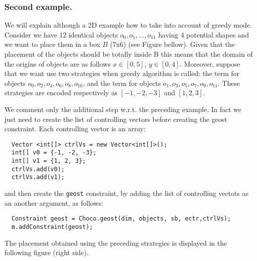\subsubsection{Second example.}\label{geostdescription:secondexample}\hypertarget{geostdescription:secondexample}{}
We will explain although a 2D example how to take into account of greedy mode. Consider we have 12 identical objects $o_0,o_1,\ldots,o_{11}$ having 4 potential shapes and we want to place them in a box $B$ (7x6) (see Figure bellow). Given that the placement of the objects should be totally inside B this means that the domain of the origins of objects are as follows $x\in [0,5]$, $y\in [0,4]$. Moreover, suppose that we want use two strategies when greedy algorithm is called: the term  for objects $o_0, o_2, o_4, o_6, o_8, o_{10}$, and the term  for objects $o_1, o_3, o_5, o_7, o_9, o_{11}$. These strategies are encoded respectively as $[-1,-2,-3]$ and $[1, 2, 3]$.


We comment only the additional step w.r.t. the preceding example. In fact we just need to create the list of controlling vectors before creating the geost constraint. Each controlling vector is an array:
\begin{lstlisting}
  Vector <int[]> ctrlVs = new Vector<int[]>();
  int[] v0 = {-1, -2, -3};
  int[] v1 = {1, 2, 3};
  ctrlVs.add(v0);
  ctrlVs.add(v1);
\end{lstlisting}
and then create the \texttt{geost} constraint, by adding the list of controlling vectots as an another argument, as follows:
\begin{lstlisting}
  Constraint geost = Choco.geost(dim, objects, sb, ectr,ctrlVs);
  m.addConstraint(geost);
\end{lstlisting}

%


The placement obtained using the preceding strategies is displayed in the following figure (right side).



